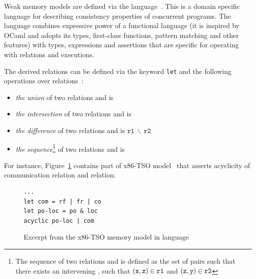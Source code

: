 Weak memory models are defined via the \cat language~\cite{alglave2016syntax}.
This is a domain specific language for describing consistency properties of concurrent programs.
The \cat language combines expressive power of a functional language (it is inspired by OCaml and adopts its types, first-class functions, pattern matching and other features) with types, expressions and assertions that are specific for operating with relations and executions.

The derived relations can be defined via the keyword \texttt{let} and the following operations over relations~\cite{alglave2016syntax}: %

\begin{itemize}
	\item \textit{the union} of two relations  and  is 
	\item \textit{the intersection} of two relations  and  is 
	\item \textit{the difference} of two relations  and  is $\mathtt{r1\,\backslash\,r2}$
	\item \textit{the sequence}\footnote{The sequence of two relations  and  is defined as the set of pairs  such that there exists an intervening , such that $\mathtt{(x,z)} \in \mathtt{r1}$ and $\mathtt{(z,y)} \in \mathtt{r2}$}
	of two relations  and  is 
\end{itemize}

For instance, Figure~\ref{example:x86-cat} contains part of x86-TSO model~\cite{owens2009better} that asserts acyclicity of communication relation and  relation:

\begin{figure}[!h]
\begin{lstlisting}
...
let com = rf | fr | co
let po-loc = po & loc
acyclic po-loc | com
\end{lstlisting}
\caption{Excerpt from the x86-TSO memory model in \cat language}
\label{example:x86-cat}
\end{figure}



